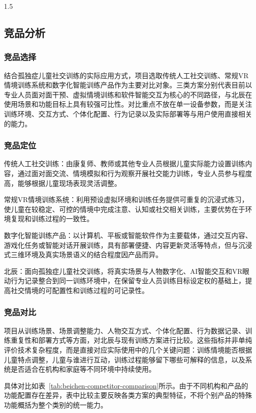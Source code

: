 \documentclass[zihao=-4]{ctexart}
\begin{document}
\begin{spacing}{1.5}
\subsection{竞品分析}

\subsubsection{竞品选择}

结合孤独症儿童社交训练的实际应用方式，项目选取传统人工社交训练、常规VR情境训练系统和数字化智能训练产品作为主要对比对象。三类方案分别代表目前以专业人员面对面干预、虚拟情境训练和软件智能交互为核心的不同路径，与北辰在使用场景和功能目标上具有较强可比性。对比重点不放在单一设备参数，而是关注训练环境、交互方式、个体化配置、行为记录以及实际部署等与用户使用直接相关的能力。

\subsubsection{竞品定位}

传统人工社交训练：由康复师、教师或其他专业人员根据儿童实际能力设置训练内容，通过面对面交流、情境模拟和行为观察开展社交能力训练，专业人员参与程度高，能够根据儿童现场表现灵活调整。

常规VR情境训练系统：利用预设虚拟环境和训练任务提供可重复的沉浸式练习，使儿童在较稳定、可控的情境中完成注意、认知或社交相关训练，主要优势在于环境复现和训练过程的一致性。

数字化智能训练产品：以计算机、平板或智能软件作为主要载体，通过交互内容、游戏化任务或智能对话开展训练，具有部署便捷、内容更新灵活等特点，但与沉浸式三维环境及真实场景语义的结合程度因产品而异。

北辰：面向孤独症儿童社交训练，将真实场景与人物数字化、AI智能交互和VR眼动行为记录整合到同一训练环境中，在保留专业人员训练目标设定权的基础上，提高社交情境的可配置性和训练过程的可记录性。

\subsubsection{竞品对比}

项目从训练场景、场景调整能力、人物交互方式、个体化配置、行为数据记录、训练重复性和部署方式等方面，对北辰与现有训练方案进行比较。这些指标并非单纯评价技术复杂程度，而是直接对应实际使用中的几个关键问题：训练情境能否根据儿童特点调整，儿童与谁进行互动，训练过程能够留下哪些可解释的信息，以及系统是否适合在机构和家庭等不同环境中持续使用。


具体对比如表~\ref{tab:beichen-competitor-comparison}所示。由于不同机构和产品的功能配置存在差异，表中比较主要反映各类方案的典型特征，不将个别产品的特殊功能概括为整个类别的统一能力。


\end{spacing}
\end{document}

